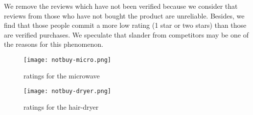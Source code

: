 \documentclass{mcmthesis}
\begin{document}
We remove the reviews which have not been verified because we consider that reviews from those who have not bought the product are unreliable. Besides, we find that those people commit a more low rating (1 star or two stars) than those are verified purchases. We speculate that slander from competitors may be one of the reasons for this phenomenon.


\begin{figure}[h]
  \small
  \centering
  \texttt{[image: notbuy-micro.png]}
  \caption{ratings for the microwave}
\end{figure}

\begin{figure}[h]
  \small
  \centering
  \texttt{[image: notbuy-dryer.png]}
  \caption{ratings for the hair-dryer}
\end{figure}
\end{document}

